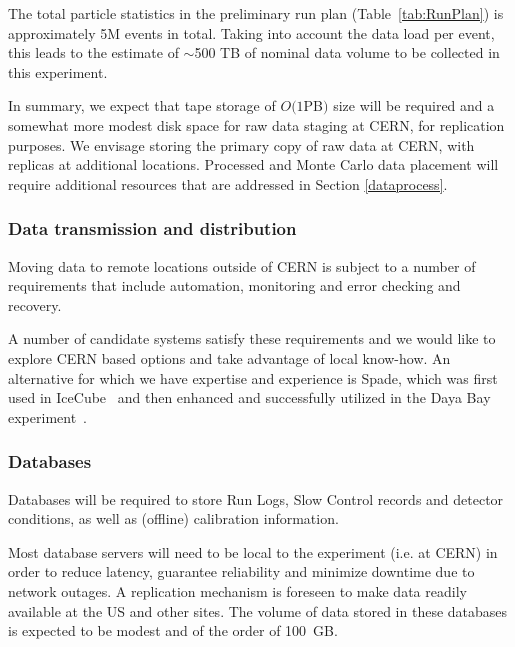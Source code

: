
The total particle statistics in the preliminary run plan (Table~\ref{tab:RunPlan}) is approximately 5M events in total.  Taking into account the data load per event, this leads to the estimate of $\sim$500 TB of nominal data volume to be collected in this experiment. 

In summary, we expect that tape storage of $O(1 $PB$)$ size will be required and a somewhat more modest disk space for raw data staging at CERN, for replication purposes.  We envisage storing the primary copy of raw data at CERN, with replicas at additional locations. 
%
Processed and Monte Carlo data placement will require additional resources that are addressed in Section \ref{dataprocess}.


\subsubsection{Data transmission and distribution}
Moving data to remote locations outside of CERN is subject to a number of requirements that include
automation, monitoring and error checking and recovery. 

A number of candidate systems satisfy these requirements and we would like to explore CERN based options and take advantage of 
local know-how. An alternative for which we have expertise and experience is Spade, which was first used in IceCube~\cite{spade_icecube} and then enhanced and successfully utilized in the Daya Bay experiment~\cite{spade_dayabay}.


\subsubsection{Databases}
Databases will be required to store Run Logs, Slow Control records and detector conditions, as well as (offline) calibration information.

Most database servers will need to be local to the experiment (i.e. at CERN) in order to reduce latency, guarantee reliability and minimize
downtime due to network outages. A replication mechanism is foreseen to make data readily available at the US and other sites.
The volume of data stored in these databases is expected to be modest and of the order of 100~GB.


